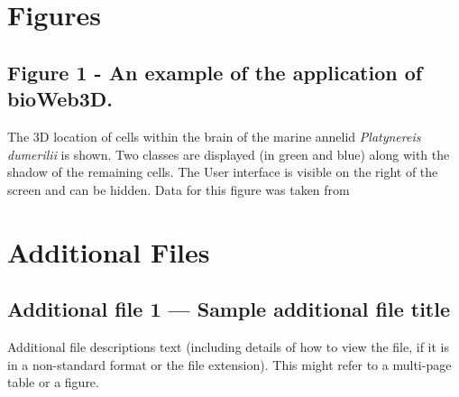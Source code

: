 \documentclass[10pt]{bmc_article}
\newenvironment{bmcformat}{\baselineskip20pt\sloppy\setboolean{publ}{false}}{\baselineskip20pt\sloppy}
\begin{document}
\begin{bmcformat}




\section*{Figures}
  \subsection*{Figure 1 - An example of the application of bioWeb3D.}
	The 3D location of cells within the brain of the marine annelid {\it{Platynereis dumerilii}} is shown. Two classes are displayed (in green and blue) along with the shadow of the remaining cells. The User interface is visible on the right of the screen and can be hidden. Data for this figure was taken from \cite{Tomer10}







\section*{Additional Files}
  \subsection*{Additional file 1 --- Sample additional file title}
    Additional file descriptions text (including details of how to
    view the file, if it is in a non-standard format or the file extension).  This might
    refer to a multi-page table or a figure.



\end{bmcformat}
\end{document}
